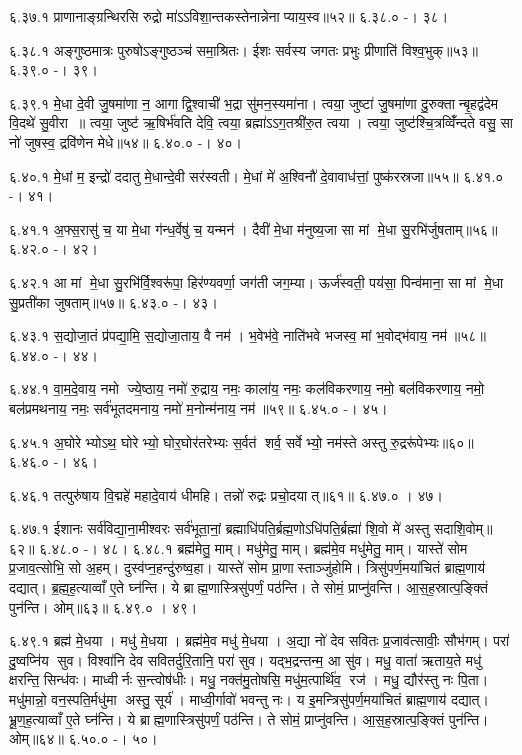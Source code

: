 ६.३७.१
प्राणानाङ्ग्रन्थिरसि रुद्रो मा॑ऽऽविशा॒न्तकस्तेनान्नेनाप्याय॒स्व॥५२॥
६.३८.०
-। ३८।
\anuvakamend

६.३८.१
अङ्गुष्ठमात्रः पुरुषोऽङ्गुष्ठञ्च॑ समा॒श्रितः। ईशः सर्वस्य जगतः प्रभुः प्रीणाति॑ विश्व॒भुक्॥५३॥
६.३९.०
-। ३९।
\anuvakamend

६.३९.१
मे॒धा दे॒वी जु॒षमा॑णा न॒ आगाद्वि॒श्वाची॑ भ॒द्रा सु॑मन॒स्यमा॑ना। त्वया॒ जुष्टा॑ जु॒षमा॑णा दु॒रुक्तान्बृ॒हद्व॑देम वि॒दथे॑ सु॒वीरा॥ त्वया॒ जुष्ट॑ ऋ॒षिर्भ॑वति देवि॒ त्वया॒ ब्रह्मा॑ऽऽग॒तश्री॑रु॒त त्वया। त्वया॒ जुष्ट॑श्चि॒त्रव्विँ॑न्दते वसु॒ सा नो॑ जुषस्व॒ द्रवि॑णेन मेधे॥५४॥
६.४०.०
-। ४०।
\anuvakamend

६.४०.१
मे॒धां म॒ इन्द्रो॑ ददातु मे॒धान्दे॒वी सर॑स्वती। मे॒धां मे॑ अ॒श्विनौ॑ दे॒वावाध॑त्तां॒ पुष्क॑रस्रजा॥५५॥
६.४१.०
-। ४१।
\anuvakamend

६.४१.१
अ॒फ्स॒रासु॑ च॒ या मे॒धा ग॑न्ध॒र्वेषु॑ च॒ यन्मन॑। दैवी॑ मे॒धा म॑नुष्य॒जा सा मां मे॒धा सु॒रभि॑र्जुषताम्॥५६॥
६.४२.०
-। ४२।
\anuvakamend

६.४२.१
आ मां मे॒धा सु॒रभि॑र्वि॒श्वरू॑पा॒ हिर॑ण्यवर्णा॒ जग॑ती जग॒म्या। ऊर्ज॑स्वती॒ पय॑सा॒ पिन्व॑माना॒ सा मां मे॒धा सु॒प्रती॑का जुषताम्॥५७॥
६.४३.०
-। ४३।
\anuvakamend

६.४३.१
स॒द्योजा॒तं प्र॑पद्या॒मि॒ स॒द्योजा॒ताय॒ वै नम॑। भ॒वेभ॑वे॒ नाति॑भवे भजस्व॒ मां भ॒वोद्भ॑वाय॒ नम॑॥५८॥
६.४४.०
-। ४४।
\anuvakamend

६.४४.१
वा॒म॒दे॒वाय॒ नमो ज्ये॒ष्ठाय॒ नमो॑ रु॒द्राय॒ नमः॒ काला॑य॒ नमः॒ कल॑विकरणाय॒ नमो॒ बल॑विकरणाय॒ नमो॒ बल॑प्रमथनाय॒ नमः॒ सर्व॑भूतदमनाय॒ नमो॑ म॒नोन्म॑नाय॒ नम॑॥५९॥
६.४५.०
-। ४५।
\anuvakamend

६.४५.१
अ॒घोरेभ्योऽथ॒ घोरेभ्यो॒ घोर॒घोर॑तरेभ्यः स॒र्वत॑ शर्व॒ सर्वेभ्यो॒ नम॑स्ते अस्तु रु॒द्ररू॑पेभ्यः॥६०॥
६.४६.०
-। ४६।
\anuvakamend

६.४६.१
तत्पुरु॑षाय वि॒द्महे॑ महादे॒वाय॑ धीमहि। तन्नो॑ रुद्रः प्रचो॒दयात्॥६१॥
६.४७.०
। ४७।
\anuvakamend

६.४७.१
ईशानः सर्व॑विद्या॒ना॒मीश्वरः सर्व॑भूता॒नां॒ ब्रह्माधि॑पति॒र्ब्रह्म॒णोऽधि॑पति॒र्ब्रह्मा॑ शि॒वो मे॑ अस्तु सदाशि॒वोम्॥६२॥
६.४८.०
-। ४८।
६.४८.१
ब्रह्म॑मेतु॒ माम्। मधु॑मेतु॒ माम्। ब्रह्म॑मे॒व मधु॑मेतु॒ माम्। यास्ते॑ सोम प्र॒जाव॒त्सोभि॒ सो अ॒हम्। दुस्व॑प्न॒हन्दु॑रुष्व॒हा। यास्ते॑ सोम प्रा॒णास्ताञ्जु॑होमि। त्रिसु॑पर्ण॒मया॑चितं ब्राह्म॒णाय॑ दद्यात्। ब्र॒ह्म॒ह॒त्याव्वाँ ए॒ते घ्न॑न्ति। ये ब्राह्म॒णास्त्रिसु॑पर्णं॒ पठ॑न्ति। ते सोमं॒ प्राप्नु॑वन्ति। आ॒स॒ह॒स्रात्प॒ङ्क्तिं पुन॑न्ति। ओम्॥६३॥
६.४९.०
। ४९।
\anuvakamend

६.४९.१
ब्रह्म॑ मे॒धया। मधु॑ मे॒धया। ब्रह्म॑मे॒व मधु॑ मे॒धया। अ॒द्या नो॑ देव सवितः प्र॒जाव॑त्सावीः॒ सौभ॑गम्। परा॑ दु॒ष्वप्नि॑य सुव। विश्वा॑नि देव सवितर्दुरि॒तानि॒ परा॑ सुव। यद्भ॒द्रन्तन्म॒ आ सु॑व। मधु॒ वाता॑ ऋताय॒ते मधु॑ क्षरन्ति॒ सिन्ध॑वः। माध्वीर्नः स॒न्त्वोष॑धीः। मधु॒ नक्त॑मु॒तोषसि॒ मधु॑म॒त्पार्थि॑व॒ रज॑। मधु॒ द्यौर॑स्तु नः पि॒ता। मधु॑मान्नो॒ वन॒स्पति॒र्मधु॑मा अस्तु॒ सूर्य॑। माध्वी॒र्गावो॑ भवन्तु नः। य इ॒मन्त्रिसु॑पर्ण॒मया॑चितं ब्राह्म॒णाय॑ दद्यात्। भ्रू॒ण॒ह॒त्याव्वाँ ए॒ते घ्न॑न्ति। ये ब्राह्म॒णास्त्रिसु॑पर्णं॒ पठ॑न्ति। ते सोमं॒ प्राप्नु॑वन्ति। आ॒स॒ह॒स्रात्प॒ङ्क्तिं पुन॑न्ति। ओम्॥६४॥
६.५०.०
-। ५०।
\anuvakamend

